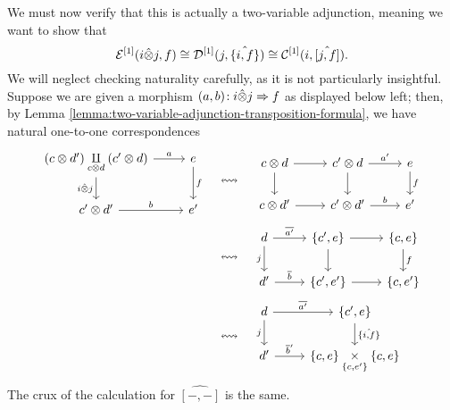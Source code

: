 \begin{construction}
	We must now verify that this is actually a two-variable adjunction, meaning we want to show that
	\[ \mathcal{E}^{[1]}(i\hat\otimes j, f) \cong \mathcal{D}^{[1]}(j, \hat{ \{i,f\} }) \cong \mathcal{C}^{[1]}(i, \hat{ [j,f] }). \]
	We will neglect checking naturality carefully, as it is not particularly insightful. Suppose we are given a morphism \((a,b)\!:i\hat\otimes j \Rightarrow f\) as displayed below left;
	then, by Lemma \ref{lemma:two-variable-adjunction-transposition-formula}, we have natural one-to-one correspondences
	\begin{align*}
		\begin{tikzcd}[ampersand replacement=\&]
			(c\otimes d') \underset{c\otimes d}\amalg(c'\otimes d) \ar[d,"i\hat\otimes j"']\ar[r,"a"] \& e\ar[d,"f"] \\
			c'\otimes d'\ar[r,"b"] \& e'
		\end{tikzcd} \quad &\leftrightsquigarrow \quad
		\begin{tikzcd}[ampersand replacement=\&]
			c\otimes d\ar[r]\ar[d] \& c'\otimes d \ar[d]\ar[r,"a'"] \& e\ar[d,"f"] \\
			c\otimes d'\ar[r] \& c'\otimes d'\ar[r,"b"] \& e'
		\end{tikzcd} \\
		&\leftrightsquigarrow \quad
		\begin{tikzcd}[ampersand replacement=\&]
			d\ar[r,"\overline{a'}"]\ar[d,"j"'] \& \{c',e\} \ar[d]\ar[r] \& \{c,e\} \ar[d,"f"] \\
			d'\ar[r,"\overline{b}"] \& \{c',e'\}\ar[r] \& \{c,e'\}
		\end{tikzcd} \\
		&\leftrightsquigarrow \quad
		\begin{tikzcd}[ampersand replacement=\&]
			d\ar[r,"\overline{a'}"]\ar[d,"j"'] \& \{c',e\} \ar[d,"\hat{ \{i,f\} }"] \\
			d'\ar[r,"\overline{b}'"] \& \{c,e\}\underset{\{c,e'\}}\times \{c,e\}
		\end{tikzcd}
	\end{align*}
	The crux of the calculation for \(\hat{[-,-]}\) is the same.
\end{construction}

